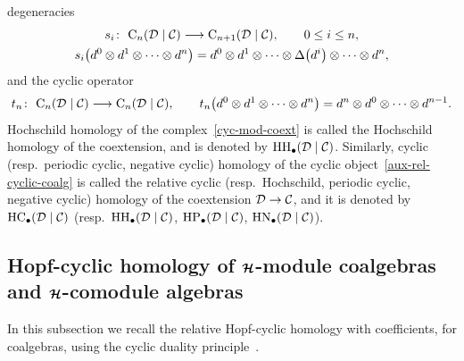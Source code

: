 \documentclass[pdftex]{sigma}
\numberwithin{equation}{section}
\begin{document}
degeneracies
\begin{gather*}%
s_i\colon \ {\rm C}_n({\cal D}\mid{\cal C}) \longrightarrow {\rm C}_{n+1}({\cal D}\mid{\cal C}),
\qquad
0 \leq i \leq n,
\\
s_i\big(d^0\otimes d^1\otimes \cdots\otimes d^n\big) =d^0\otimes d^1\otimes \cdots \otimes\Delta\big(d^i\big)\otimes \cdots \otimes
d^n,
\end{gather*}
and the cyclic operator
\begin{gather*}%
t_n\colon \ {\rm C}_n({\cal D}\mid{\cal C}) \longrightarrow {\rm C}_n({\cal D}\mid{\cal C}),
\qquad
t_n\big(d^0\otimes d^1\otimes \cdots\otimes d^n\big) =d^n\otimes d^0\otimes \cdots\otimes d^{n-1}.
\end{gather*}
Hochschild homology of the complex~\eqref{cyc-mod-coext} is called the Hochschild homology of the coextension, and is
denoted by ${\rm HH}_\bullet({\cal D}\mid{\cal C})$.
Similarly, cyclic (resp.\
periodic cyclic, negative cyclic) homology of the cyclic object~\eqref{aux-rel-cyclic-coalg} is called the relative
cyclic (resp.\
Hochschild, periodic cyclic, negative cyclic) homology of the coextension ${\cal D} \rightarrow{\cal C}$, and it is
denoted by ${\rm HC}_\bullet({\cal D}\mid{\cal C})$ (resp.\
${\rm HH}_\bullet({\cal D}\mid{\cal C})$, ${\rm HP}_\bullet({\cal D}\mid{\cal C})$, ${\rm HN}_\bullet({\cal D}\mid{\cal C})$).

\subsection[Hopf-cyclic homology of ${\cal H}$-module coalgebras and ${\cal H}$-comodule algebras]{Hopf-cyclic homology
of $\boldsymbol{\cal H}$-module coalgebras and $\boldsymbol{\cal H}$-comodule algebras}

In this subsection we recall the relative Hopf-cyclic homology with coef\/f\/icients, for coalgebras, using the cyclic
duality principle~\cite{Conn83,KhalRang05}.
\end{document}
